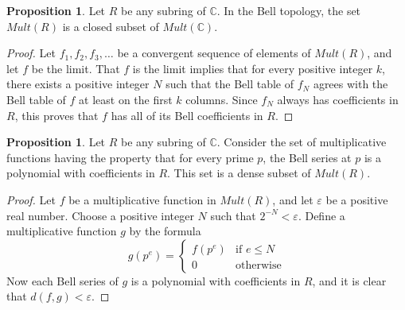 \documentclass[a4paper]{article}
\theoremstyle{definition}
\newtheorem{definition}{Definition}[section]
\newtheorem{proposition}[theorem]{Proposition}
\theoremstyle{remark}
\newcommand{\C}{\mathbb{C}}
\newcommand{\defhl}[1]{\textbf{#1}}
\newcommand{\twopartdef}[4]
{
	\left\{
		\begin{array}{ll}
			#1 & \mbox{if } #2 \\
			#3 & \mbox{} #4
		\end{array}
	\right.
}
\begin{document}



\begin{proposition}
Let $R$ be any subring of $\C$. In the Bell topology, the set $Mult(R)$ is a closed subset of $Mult(\C)$.
\end{proposition}
\begin{proof}
Let $f_1, f_2, f_3, \ldots$ be a convergent sequence of elements of $Mult(R)$, and let $f$ be the limit. That $f$ is the limit implies that for every positive integer $k$, there exists a positive integer $N$ such that the Bell table of $f_N$ agrees with the Bell table of $f$ at least on the first $k$ columns. Since $f_N$ always has coefficients in $R$, this proves that $f$ has all of its Bell coefficients in $R$. 
\end{proof}


\begin{proposition}
Let $R$ be any subring of $\C$. Consider the set of multiplicative functions having the property that for every prime $p$, the Bell series at $p$ is a polynomial with coefficients in $R$. This set is a dense subset of $Mult(R)$. 
\end{proposition}


\begin{proof}
Let $f$ be a multiplicative function in $Mult(R)$, and let $\varepsilon$ be a positive real number. Choose a positive integer $N$ such that $2^{-N} < \varepsilon$. Define a multiplicative function $g$ by the formula
$$ g(p^e) = \twopartdef { f(p^e) } {e  \leq N  } {0} {\textrm{otherwise}}$$
Now each Bell series of $g$ is a polynomial with coefficients in $R$, and it is clear that $d(f, g) < \varepsilon$.
\end{proof}
\end{document}
